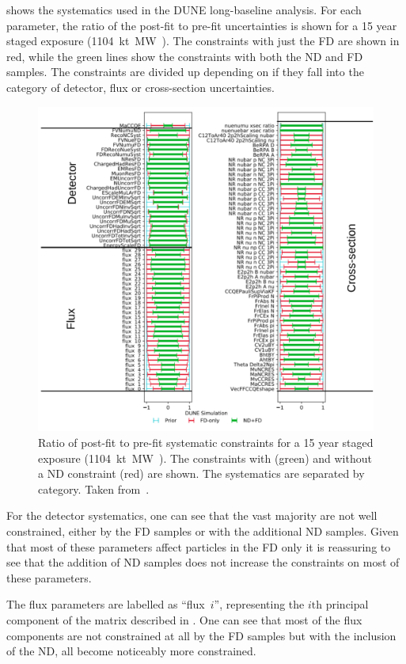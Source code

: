  shows the systematics used in the DUNE long-baseline analysis.
For each parameter, the ratio of the post-fit to pre-fit uncertainties is shown for a 15 year staged exposure (\SI{1104}{\kilo\tonne\mega\watt\year}).
The constraints with just the FD are shown in red, while the green lines show the constraints with both the ND and FD samples.
The constraints are divided up depending on if they fall into the category of detector, flux or cross-section uncertainties.

\begin{figure}[h]
	\centering
	\includegraphics[width=.8\linewidth]{files/figures/dune_lbl/constraintsWithLines}
	\caption[DUNE systematic constraints with and without a near detector constraint]{Ratio of post-fit to pre-fit systematic constraints for a 15 year staged exposure (\SI{1104}{\kilo\tonne\mega\watt\year}). The constraints with (green) and without a ND constraint (red) are shown. The systematics are separated by category. Taken from~\cite{Abi:2020qib}.}
	\label{fig:systConstraints}
\end{figure}

For the detector systematics, one can see that the vast majority are not well constrained, either by the FD samples or with the additional ND samples.
Given that most of these parameters affect particles in the FD only it is reassuring to see that the addition of ND samples does not increase the constraints on most of these parameters.

The flux parameters are labelled as ``flux~$i$'', representing the $i\text{th}$ principal component of the matrix described in .
One can see that most of the flux components are not constrained at all by the FD samples but with the inclusion of the ND, all become noticeably more constrained.

